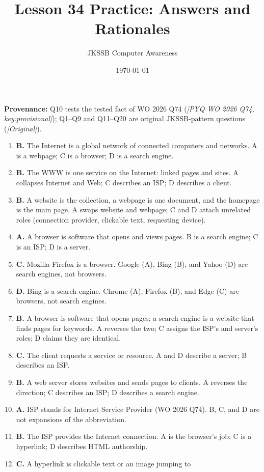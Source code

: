 \documentclass[11pt]{article}
\title{Lesson 34 Practice: Answers and Rationales}
\author{JKSSB Computer Awareness}
\date{\today}
\begin{document}
\maketitle
\noindent\textbf{Provenance:} Q10 tests the tested fact of WO 2026 Q74
(\textit{[PYQ WO 2026 Q74, key:provisional]}); Q1--Q9 and Q11--Q20 are
original JKSSB-pattern questions (\textit{[Original]}).
\begin{enumerate}[label=\textbf{Q\arabic*.}, leftmargin=*]
\item \textbf{B.} The Internet is a global network of connected computers and
  networks. A is a webpage; C is a browser; D is a search engine.
\item \textbf{B.} The WWW is one service on the Internet: linked pages and
  sites. A collapses Internet and Web; C describes an ISP; D describes a
  client.
\item \textbf{B.} A website is the collection, a webpage is one document, and
  the homepage is the main page. A swaps website and webpage; C and D attach
  unrelated roles (connection provider, clickable text, requesting device).
\item \textbf{A.} A browser is software that opens and views pages. B is a
  search engine; C is an ISP; D is a server.
\item \textbf{C.} Mozilla Firefox is a browser. Google (A), Bing (B), and
  Yahoo (D) are search engines, not browsers.
\item \textbf{D.} Bing is a search engine. Chrome (A), Firefox (B), and Edge
  (C) are browsers, not search engines.
\item \textbf{B.} A browser is software that opens pages; a search engine is
  a website that finds pages for keywords. A reverses the two; C assigns the
  ISP's and server's roles; D claims they are identical.
\item \textbf{C.} The client requests a service or resource. A and D describe
  a server; B describes an ISP.
\item \textbf{B.} A web server stores websites and sends pages to clients. A
  reverses the direction; C describes an ISP; D describes a search engine.
\item \textbf{A.} ISP stands for Internet Service Provider (WO 2026 Q74).
  B, C, and D are not expansions of the abbreviation.
\item \textbf{B.} The ISP provides the Internet connection. A is the
  browser's job; C is a hyperlink; D describes HTML authorship.
\item \textbf{C.} A hyperlink is clickable text or an image jumping to

\end{enumerate}
\end{document}
